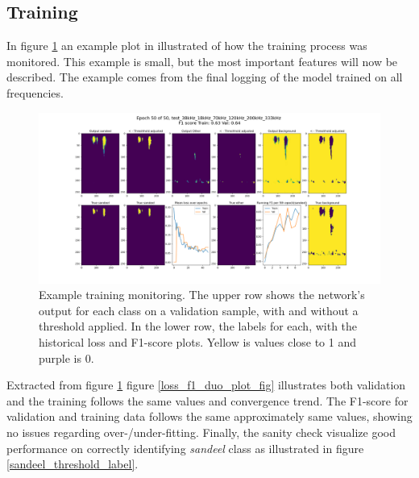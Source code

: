     \subsection{Training}
        In figure \ref{training_overveiw_fig} an example plot in illustrated of how the training process was monitored. This example is small, but the most important features will now be described. The example comes from the final logging of the model trained on all frequencies.
        \clearpage
        \begin{figure}[H]
            \centering
            \includegraphics[scale=0.3]{figures/epoch_50_test_38kHz_18kHz_70kHz_120kHz_200kHz_333kHz.png}
            \caption[Training example monitoring]{Example training monitoring. The upper row shows the network's output for each class on a validation sample, with and without a threshold applied. In the lower row, the labels for each, with the historical loss and F1-score plots. Yellow is values close to 1 and purple is 0.}
          	\medskip 
            \label{training_overveiw_fig}
        \end{figure}
        
        
        Extracted from figure \ref{training_overveiw_fig} figure \ref{loss_f1_duo_plot_fig} illustrates both validation and the training follows the same values and convergence trend. The F1-score for validation and training data follows the same approximately same values, showing no issues regarding over-/under-fitting. Finally, the sanity check visualize good performance on correctly identifying \textit{sandeel} class as illustrated in figure \ref{sandeel_threshold_label}.%
        
